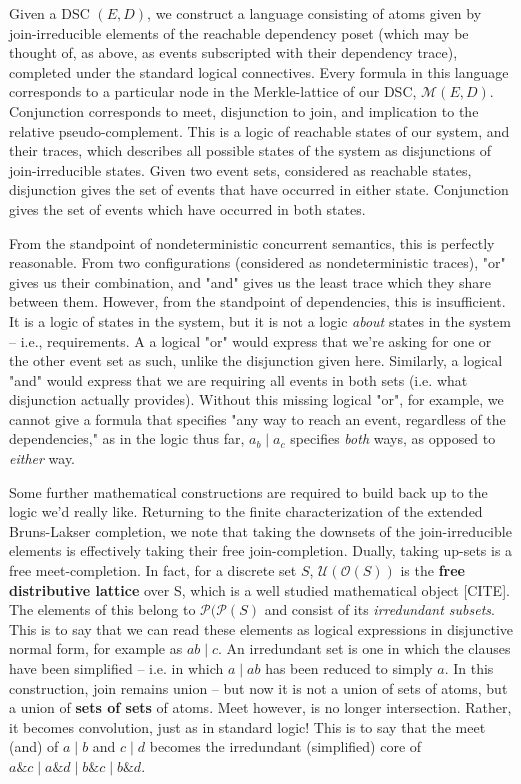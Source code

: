 \documentclass[hoptionsi,review,format=acmsmall]{acmart}
\theoremstyle{definition}
\newcommand{\Mcc}{\mathcal{M}}
\newcommand{\Oc}{\mathcal{O}}
\newcommand{\Pc}{\mathcal{P}}
\newcommand{\Uc}{\mathcal{U}}
\newcommand{\band}{\mathbin{\&}}
\newcommand{\bor}{\mathbin{|}}
\begin{document}
Given a DSC \((E,D)\), we construct a language consisting of atoms given by join-irreducible elements of the reachable dependency poset (which may be thought of, as above, as events subscripted with their dependency trace), completed under the standard logical connectives. Every formula in this language corresponds to a particular node in the Merkle-lattice of our DSC, \(\Mcc(E,D)\).  Conjunction corresponds to meet, disjunction to join, and implication to the relative pseudo-complement. This is a logic of reachable states of our system, and their traces, which describes all possible states of the system as disjunctions of join-irreducible states. Given two event sets, considered as reachable states, disjunction gives the set of events that have occurred in either state. Conjunction gives the set of events which have occurred in both states.


From the standpoint of nondeterministic concurrent semantics, this is perfectly reasonable. From two configurations (considered as nondeterministic traces), "or" gives us their combination, and "and" gives us the least trace which they share between them. However, from the standpoint of dependencies, this is insufficient. It is a logic of states in the system, but it is not a logic \textit{about} states in the system -- i.e., requirements. A a logical "or"  would express that we're asking for one or the other event set as such, unlike the disjunction given here. Similarly, a logical "and" would express that we are requiring all events in both sets (i.e. what disjunction actually provides). Without this missing logical "or", for example, we cannot give a formula that specifies "any way to reach an event, regardless of the dependencies," as in the logic thus far, \(a_b \bor a_c\) specifies \textit{both} ways, as opposed to \textit{either} way.

Some further mathematical constructions are required to build back up to the logic we'd really like. Returning to the finite characterization of the extended Bruns-Lakser completion, we note that taking the downsets of the join-irreducible elements is effectively taking their free join-completion. Dually, taking up-sets is a free meet-completion. In fact, for a discrete set \(S\), \(\Uc(\Oc(S))\) is the \textbf{free distributive lattice} over S, which is a well studied mathematical object [CITE]. The elements of this belong to \(\Pc(\Pc(S)\) and consist of its \textit{irredundant subsets}. This is to say that we can read these elements as logical expressions in disjunctive normal form, for example as \(ab \bor c\). An irredundant set is one in which the clauses have been simplified -- i.e. in which \(a \bor ab\) has been reduced to simply \(a\).  In this construction, join remains union -- but now it is not a union of sets of atoms, but a union of \textbf{sets of sets} of atoms. Meet however, is no longer intersection. Rather, it becomes convolution, just as in standard logic! This is to say that the meet (and) of \(a \bor b\) and \(c \bor d\) becomes the irredundant (simplified) core of \(a \band c \bor a \band d \bor b \band c \bor b \band d\).
\end{document}
